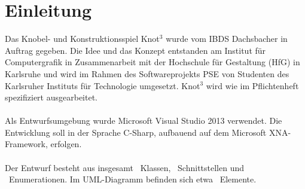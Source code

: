 \chapter{Einleitung}


Das Knobel- und Konstruktionsspiel Knot$^3$ wurde vom IBDS Dachsbacher in Auftrag gegeben. Die Idee und das Konzept entstanden am Institut für Computergrafik in Zusammenarbeit mit der Hochschule für Gestaltung (HfG) in Karlsruhe und wird im Rahmen des Softwareprojekts PSE von Studenten des Karlsruher Instituts für Technologie umgesetzt. Knot$^3$ wird wie im Pflichtenheft spezifiziert ausgearbeitet.
\\\\
Als Entwurfsumgebung wurde Microsoft Visual Studio 2013 verwendet. Die Entwicklung soll in der Sprache C-Sharp, aufbauend auf dem Microsoft XNA-Framework, erfolgen.
\\\\
Der Entwurf besteht aus insgesamt \CountClasses~Klassen, \CountInterfaces~Schnittstellen und \CountEnums~Enumerationen.
Im UML-Diagramm befinden sich etwa \CountAll~Elemente.